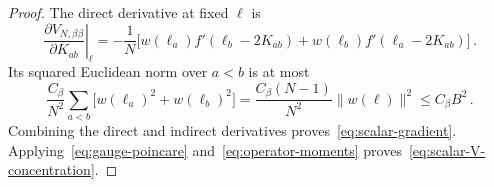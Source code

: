 \documentclass[11pt]{amsart}
\numberwithin{equation}{section}
\theoremstyle{remark}
\begin{document}
\begin{proof}
The direct derivative at fixed $\ell$ is
\begin{equation*}
 \left.\frac{\partial V_{N,\beta\beta}}{\partial K_{ab}}\right|_\ell
 =-\frac1N\bigl[w(\ell_a)f'(\ell_b-2K_{ab})
 +w(\ell_b)f'(\ell_a-2K_{ab})\bigr]\,.
\end{equation*}
Its squared Euclidean norm over $a<b$ is at most
\begin{equation*}
 \frac{C_\beta}{N^2}\sum_{a<b}\bigl[w(\ell_a)^2+w(\ell_b)^2\bigr]
 =\frac{C_\beta(N-1)}{N^2}\|w(\ell)\|^2
 \le C_\beta B^2\,.
\end{equation*}
Combining the direct and indirect derivatives proves~\eqref{eq:scalar-gradient}. Applying~\eqref{eq:gauge-poincare} and~\eqref{eq:operator-moments} proves~\eqref{eq:scalar-V-concentration}.
\end{proof}
\end{document}
